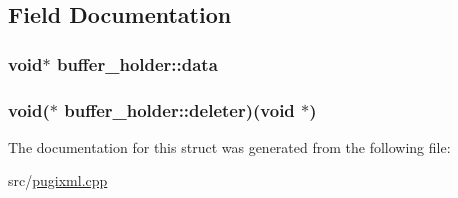 \subsection{Field Documentation}
\hypertarget{structbuffer__holder_a06c1e1004fac90848dfdb4fbc150cede}{
\subsubsection[{data}]{\setlength{\rightskip}{0pt plus 5cm}void$\ast$ {\bf buffer\_\-holder::data}}}
\label{structbuffer__holder_a06c1e1004fac90848dfdb4fbc150cede}
\hypertarget{structbuffer__holder_a96e7067c68bc1f7a9ee7dd75c84f04e8}{
\subsubsection[{deleter}]{\setlength{\rightskip}{0pt plus 5cm}void($\ast$ {\bf buffer\_\-holder::deleter})(void $\ast$)}}
\label{structbuffer__holder_a96e7067c68bc1f7a9ee7dd75c84f04e8}


The documentation for this struct was generated from the following file:\begin{DoxyCompactItemize}
\item 
src/\hyperlink{pugixml_8cpp}{pugixml.cpp}\end{DoxyCompactItemize}
